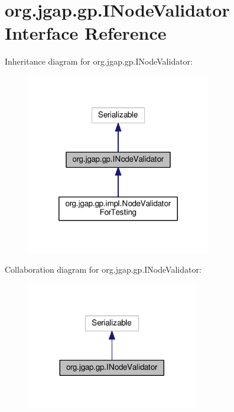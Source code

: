 \hypertarget{interfaceorg_1_1jgap_1_1gp_1_1_i_node_validator}{\section{org.\-jgap.\-gp.\-I\-Node\-Validator Interface Reference}
\label{interfaceorg_1_1jgap_1_1gp_1_1_i_node_validator}
}


Inheritance diagram for org.\-jgap.\-gp.\-I\-Node\-Validator\-:
\nopagebreak
\begin{figure}[H]
\begin{center}
\leavevmode
\includegraphics[width=228pt]{interfaceorg_1_1jgap_1_1gp_1_1_i_node_validator__inherit__graph}
\end{center}
\end{figure}


Collaboration diagram for org.\-jgap.\-gp.\-I\-Node\-Validator\-:
\nopagebreak
\begin{figure}[H]
\begin{center}
\leavevmode
\includegraphics[width=212pt]{interfaceorg_1_1jgap_1_1gp_1_1_i_node_validator__coll__graph}
\end{center}
\end{figure}
